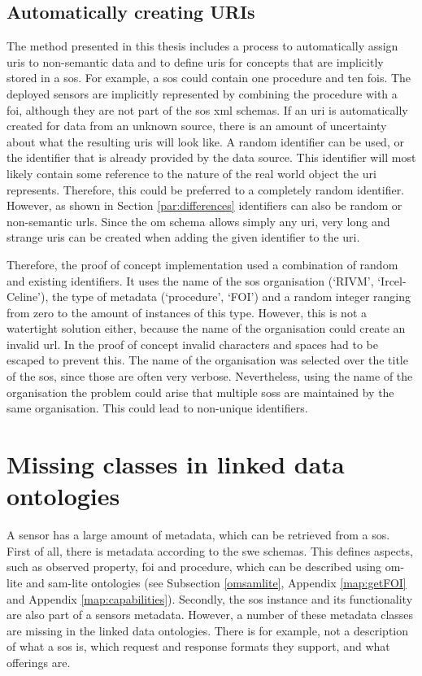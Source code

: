 \subsection{Automatically creating URIs}
The method presented in this thesis includes a process to automatically assign \acp{uri} to non-semantic data and to define \acp{uri} for concepts that are implicitly stored in a \ac{sos}. For example, a \ac{sos} could contain one procedure and ten \acp{foi}. The deployed sensors are implicitly represented by combining the procedure with a \ac{foi}, although they are not part of the \ac{sos} \ac{xml} schemas. If an \ac{uri} is automatically created for data from an unknown source, there is an amount of uncertainty about what the resulting \acp{uri} will look like. A random identifier can be used, or the identifier that is already provided by the data source. This identifier will most likely contain some reference to the nature of the real world object the \ac{uri} represents. Therefore, this could be preferred to a completely random identifier. However, as shown in Section \ref{par:differences} identifiers can also be random or non-semantic \acp{url}. Since the \ac{om} schema allows simply any \ac{uri}, very long and strange \acp{uri} can be created when adding the given identifier to the \ac{uri}. 

Therefore, the proof of concept implementation used a combination of random and existing identifiers. It uses the name of the \ac{sos} organisation (`RIVM', `Ircel-Celine'), the type of metadata (`procedure', `FOI') and a random integer ranging from zero to the amount of instances of this type. However, this is not a watertight solution either, because the name of the organisation could create an invalid \ac{url}. In the proof of concept invalid characters and spaces had to be escaped to prevent this. The name of the organisation was selected over the title of the \ac{sos}, since those are often very verbose. Nevertheless, using the name of the organisation the problem could arise that multiple \aclp{sos} are maintained by the same organisation. This could lead to non-unique identifiers. 

\section{Missing classes in linked data ontologies}

A sensor has a large amount of metadata, which can be retrieved from a \ac{sos}. First of all, there is metadata according to the \ac{swe} schemas. This defines aspects, such as observed property, \ac{foi} and procedure, which can be described using om-lite and sam-lite ontologies (see Subsection \ref{omsamlite}, Appendix \ref{map:getFOI} and Appendix \ref{map:capabilities}). Secondly, the \ac{sos} instance and its functionality are also part of a sensors metadata. However, a number of these metadata classes are missing in the linked data ontologies. There is for example, not a description of what a \ac{sos} is, which request and response formats they support, and what offerings are.

